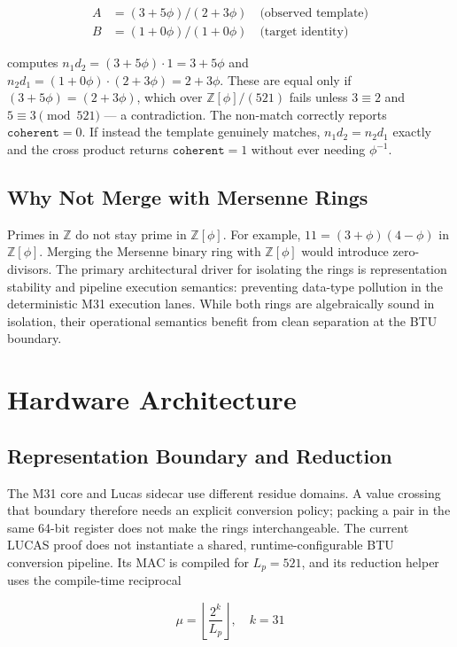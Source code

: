 \documentclass[conference]{IEEEtran}
\begin{document}
\begin{align*}
A &= (3+5\phi) / (2+3\phi) \quad \text{(observed template)} \\
B &= (1+0\phi) / (1+0\phi) \quad \text{(target identity)}
\end{align*}

computes $n_1 d_2 = (3+5\phi)\cdot1 = 3+5\phi$ and $n_2 d_1 = (1+0\phi)\cdot(2+3\phi) = 2+3\phi$. These are equal only if $(3+5\phi) = (2+3\phi)$, which over $\mathbb{Z}[\phi]/(521)$ fails unless $3\equiv2$ and $5\equiv3 \pmod{521}$ --- a contradiction. The non-match correctly reports $\texttt{coherent}=0$. If instead the template genuinely matches, $n_1 d_2 = n_2 d_1$ exactly and the cross product returns $\texttt{coherent}=1$ without ever needing $\phi^{-1}$.

\subsection{Why Not Merge with Mersenne Rings}

Primes in $\mathbb{Z}$ do not stay prime in $\mathbb{Z}[\phi]$. For example, $11 = (3+\phi)(4-\phi)$ in $\mathbb{Z}[\phi]$. Merging the Mersenne binary ring with $\mathbb{Z}[\phi]$ would introduce zero-divisors. The primary architectural driver for isolating the rings is representation stability and pipeline execution semantics: preventing data-type pollution in the deterministic M31 execution lanes. While both rings are algebraically sound in isolation, their operational semantics benefit from clean separation at the BTU boundary.

\section{Hardware Architecture}

\subsection{Representation Boundary and Reduction}

The M31 core and Lucas sidecar use different residue domains. A value crossing
that boundary therefore needs an explicit conversion policy; packing a pair in
the same 64-bit register does not make the rings interchangeable. The current
LUCAS proof does not instantiate a shared, runtime-configurable BTU conversion
pipeline. Its MAC is compiled for $L_p=521$, and its reduction helper uses the
compile-time reciprocal

\[
\mu = \left\lfloor \frac{2^{k}}{L_p} \right\rfloor,\quad k = 31
\]
\end{document}
